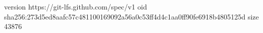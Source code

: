 version https://git-lfs.github.com/spec/v1
oid sha256:273d5ed8aafc57c481100169092a56a0c53ff4d4c1aa0ff90fe6918b4805125d
size 43876
